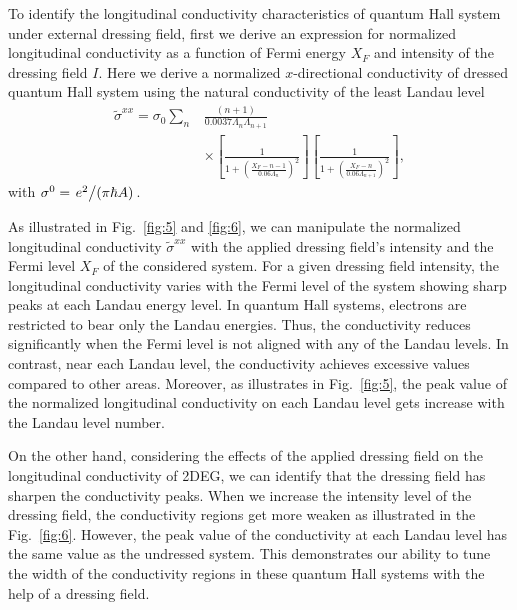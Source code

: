 
To identify the longitudinal conductivity characteristics of quantum Hall system under external dressing field, first we derive an expression for normalized longitudinal conductivity as a function of Fermi energy $X_F$ and intensity of the dressing field $I$.
Here we derive a normalized $x$-directional conductivity of dressed quantum Hall system using the natural conductivity of the least Landau level
\begin{equation} \label{eq:37}
  \begin{aligned}
    \widetilde{\sigma}^{xx} =
    \sigma_{0}
    \sum_{n} &
    \frac{(n+1)}{0.0037 \Lambda_n \Lambda_{n+1}} \\
    & \times
    \left[
      \frac{1}
      {
        1 + \left(\frac{X_F - n -1}{0.06\Lambda_n}\right)^2
      }
    \right]
    \left[
      \frac{1}
      {
        1 + \left(\frac{X_F - n}{0.06\Lambda_{n+1}}\right)^2
      }
    \right],
  \end{aligned}
\end{equation}
with $\sigma^0 = \flatfrac{e^2}{(\pi \hbar A)}$.

As illustrated in Fig.~\ref{fig:5} and \ref{fig:6}, we can manipulate the normalized longitudinal conductivity $\widetilde{\sigma}^{xx}$ with the applied dressing field's intensity and the Fermi level $X_F$ of the considered system.
For a given dressing field intensity, the longitudinal conductivity varies with  the Fermi level of the system showing sharp peaks at each Landau energy level.
In quantum Hall systems, electrons are restricted to bear only the Landau energies. Thus, the conductivity reduces significantly when the Fermi level is not aligned with any of the Landau levels. In contrast, near each Landau level, the conductivity achieves excessive values compared to other areas. Moreover, as illustrates in Fig.~\ref{fig:5}, the peak value of the normalized longitudinal conductivity on each Landau level gets increase with the Landau level number.

On the other hand, considering the effects of the applied dressing field on the longitudinal conductivity of 2DEG, we can identify that the dressing field has sharpen the conductivity peaks.
When we increase the intensity level of the dressing field, the conductivity regions get more weaken as illustrated in the Fig.~\ref{fig:6}.
However, the peak value of the conductivity at each Landau level has the same value as the undressed system. This demonstrates our ability to tune the width of the conductivity regions in these quantum Hall systems with the help of a dressing field.


